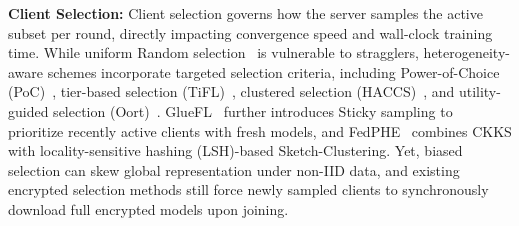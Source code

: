 \textbf{Client Selection:} Client selection governs how the server samples the active subset per round, directly impacting convergence speed and wall-clock training time. While uniform Random selection~\cite{mcmahan2017communication} is vulnerable to stragglers, heterogeneity-aware schemes incorporate targeted selection criteria, including Power-of-Choice (PoC)~\cite{cho2022towards}, tier-based selection (TiFL)~\cite{chai2020tifl}, clustered selection (HACCS)~\cite{wolfrath2022haccs}, and utility-guided selection (Oort)~\cite{lai2021oort}. GlueFL~\cite{he2023gluefl} further introduces Sticky sampling to prioritize recently active clients with fresh models, and FedPHE~\cite{li2025fedphe} combines CKKS with locality-sensitive hashing (LSH)-based Sketch-Clustering. Yet, biased selection can skew global representation under non-IID data, and existing encrypted selection methods still force newly sampled clients to synchronously download full encrypted models upon joining.
